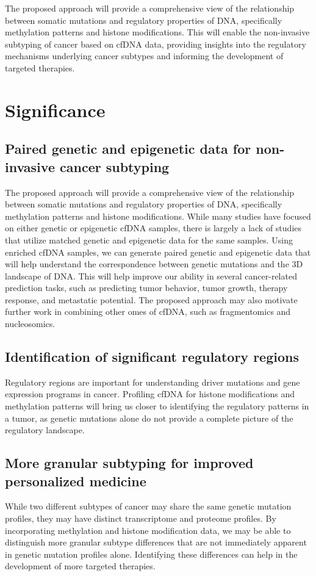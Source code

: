\documentclass[11pt]{article}
\begin{document}
The proposed approach will provide a comprehensive view of the relationship between somatic mutations and regulatory properties of DNA, specifically methylation patterns and histone modifications. This will enable the non-invasive subtyping of cancer based on cfDNA data, providing insights into the regulatory mechanisms underlying cancer subtypes and informing the development of targeted therapies.

\newpage
\section*{Significance}
\subsection*{Paired genetic and epigenetic data for non-invasive cancer subtyping} The proposed approach will provide a comprehensive view of the relationship between somatic mutations and regulatory properties of DNA, specifically methylation patterns and histone modifications. While many studies have focused on either genetic or epigenetic cfDNA samples, there is largely a lack of studies that utilize matched genetic and epigenetic data for the same samples. Using enriched cfDNA samples, we can generate paired genetic and epigenetic data that will help understand the correspondence between genetic mutations and the 3D landscape of DNA. This will help improve our ability in several cancer-related prediction tasks, such as predicting tumor behavior, tumor growth, therapy response, and metastatic potential. The proposed approach may also motivate further work in combining other omes of cfDNA, such as fragmentomics and nucleosomics.  
\subsection*{Identification of significant regulatory regions} Regulatory regions are 
important for understanding driver mutations and gene expression programs in cancer.
Profiling cfDNA for histone modifications and methylation patterns will bring us 
closer to identifying the regulatory patterns in a tumor, as genetic mutations alone
do not provide a complete picture of the regulatory landscape. 
\subsection*{More granular subtyping for improved personalized medicine}
While two different subtypes of cancer may share the same genetic mutation profiles,
they may have distinct transcriptome and proteome profiles.
By incorporating methylation and histone modification data, we may be able to
distinguish more granular subtype differences that are not immediately apparent
in genetic mutation profiles alone. 
Identifying these differences can help in the development of more targeted therapies.
\end{document}
